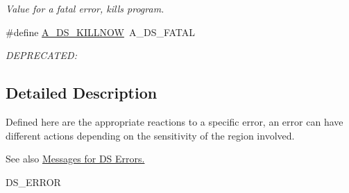 \begin{DoxyCompactItemize}
\begin{DoxyCompactList}\small\item\em Value for a fatal error, kills program. \item\end{DoxyCompactList}\item 
\hypertarget{group___a___d_s___actions_gafc6d540dbb27b62f52427a845a33212f}{
\#define \hyperlink{group___a___d_s___actions_gafc6d540dbb27b62f52427a845a33212f}{A\_\-DS\_\-KILLNOW}~A\_\-DS\_\-FATAL}
\label{group___a___d_s___actions_gafc6d540dbb27b62f52427a845a33212f}

\begin{DoxyCompactList}\small\item\em DEPRECATED: \item\end{DoxyCompactList}\end{DoxyCompactItemize}


\subsection{Detailed Description}
Defined here are the appropriate reactions to a specific error, an error can have different actions depending on the sensitivity of the region involved. \begin{DoxySeeAlso}{See also}
\hyperlink{group___m___d_s___messages}{Messages for DS Errors.} 

DS\_\-ERROR 
\end{DoxySeeAlso}
